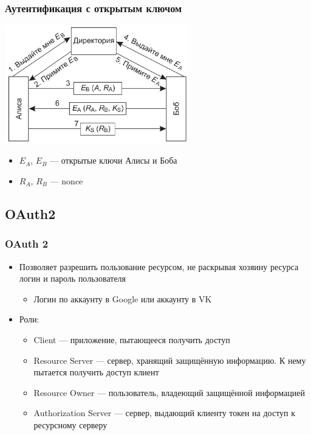 \documentclass{../../slides-style}
\begin{document}
    \begin{frame}
        \frametitle{Аутентификация с открытым ключом}
        \begin{center}
            \includegraphics[width=0.6\textwidth]{openKeyAuthentication.png}
        \end{center}
        \begin{itemize}
            \item $E_A$, $E_B$ --- открытые ключи Алисы и Боба
            \item $R_A$, $R_B$ --- nonce
        \end{itemize}
    \end{frame}

    \subsection{OAuth2}

    \begin{frame}
        \frametitle{OAuth 2}
        \begin{itemize}
            \item Позволяет разрешить пользование ресурсом, не раскрывая хозяину ресурса логин и пароль пользователя
            \begin{itemize}
                \item Логин по аккаунту в Google или аккаунту в VK
            \end{itemize}
            \item Роли:
            \begin{itemize}
                \item Client --- приложение, пытающееся получить доступ
                \item Resource Server --- сервер, хранящий защищённую информацию. К нему пытается получить доступ клиент
                \item Resource Owner --- пользователь, владеющий защищённой информацией
                \item Authorization Server --- сервер, выдающий клиенту токен на доступ к ресурсному серверу
            \end{itemize}
        \end{itemize}
    \end{frame}
\end{document}
